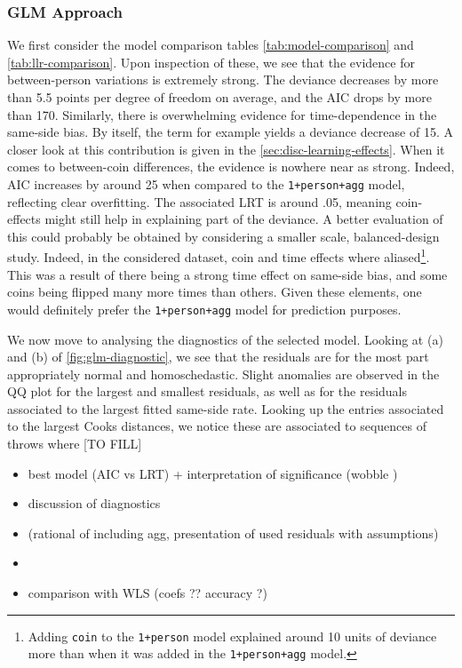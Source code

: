 \documentclass[a4paper, 12pt,oneside]{article}
\begin{document}
		\subsubsection{GLM Approach}
			We first consider the model comparison tables \ref{tab:model-comparison} and \ref{tab:llr-comparison}. 
			Upon inspection of these, we see that the evidence for between-person variations is extremely strong. The deviance decreases by more than 5.5 points per degree of freedom on average, and the AIC drops by more than 170. Similarly, there is overwhelming evidence for time-dependence in the same-side bias. By itself, the term for example yields a deviance decrease of 15. A closer look at this contribution is given in the \ref{sec:disc-learning-effects}. When it comes to between-coin differences, the evidence is nowhere near as strong. Indeed, AIC increases by around 25 when compared to the \texttt{1+person+agg} model, reflecting clear overfitting. The associated LRT is around .05, meaning coin-effects might still help in explaining part of the deviance. A better evaluation of this could probably be obtained by considering a smaller scale, balanced-design study. Indeed, in the considered dataset, coin and time effects where aliased\footnote{Adding \texttt{coin} to the \texttt{1+person} model explained around 10 units of deviance more than when it was added in the \texttt{1+person+agg} model.}. This was a result of there being a strong time effect on same-side bias, and some coins being flipped many more times than others. 
			Given these elements, one would definitely prefer the \texttt{1+person+agg} model for prediction purposes.  

			We now move to analysing the diagnostics of the selected model. Looking at (a) and (b) of \ref{fig:glm-diagnostic}, we see that the residuals are for the most part appropriately normal and homoschedastic. Slight anomalies are observed in the QQ plot for the largest and smallest residuals, as well as for the residuals associated to the largest fitted same-side rate. Looking up the entries associated to the largest Cooks distances, we notice these are associated to sequences of throws where [TO FILL]
			\begin{itemize}
				\item best model (AIC vs LRT) + interpretation of significance (wobble )
				\item discussion of diagnostics 
				\item (rational of including agg, presentation of used residuals with assumptions)
				\item 
				\item comparison with WLS (coefs ?? accuracy ?)
			\end{itemize}
\end{document}
